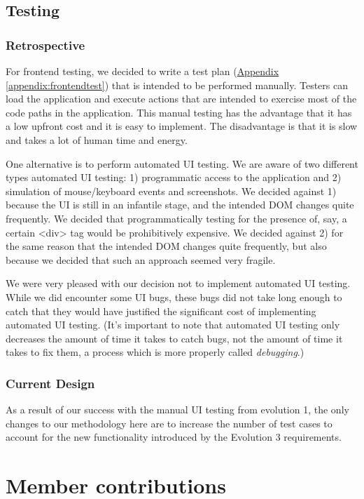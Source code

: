 \documentclass[12pt]{article}
\begin{document}
\subsection{Testing}
\subsubsection{Retrospective}
For frontend testing, we decided to write a test plan (\hyperref[appendix:frontendtest]{Appendix \ref{appendix:frontendtest}}) that is intended to be performed manually. Testers can load the application and execute actions that are intended to exercise most of the code paths in the application. This manual testing has the advantage that it has a low upfront cost and it is easy to implement. The disadvantage is that it is slow and takes a lot of human time and energy.

One alternative is to perform automated UI testing. We are aware of two different types automated UI testing: 1) programmatic access to the application and 2) simulation of mouse/keyboard events and screenshots. We decided against 1) because the UI is still in an infantile stage, and the intended DOM changes quite frequently. We decided that programmatically testing for the presence of, say, a certain <div> tag would be prohibitively expensive. We decided against 2) for the same reason that the intended DOM changes quite frequently, but also because we decided that such an approach seemed very fragile.

We were very pleased with our decision not to implement automated UI testing. While we did encounter some UI bugs, these bugs did not take long enough to catch that they would have justified the significant cost of implementing automated UI testing. (It's important to note that automated UI testing only decreases the amount of time it takes to catch bugs, not the amount of time it takes to fix them, a process which is more properly called \emph{debugging}.)

\subsubsection{Current Design}
As a result of our success with the manual UI testing from evolution 1, the only changes to our methodology here are to increase the number of test cases to account for the new functionality introduced by the Evolution 3 requirements.

\section{Member contributions}
\end{document}
